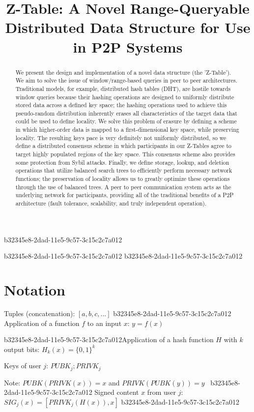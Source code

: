 \documentclass[12pt]{article}
\title{Z-Table: A Novel Range-Queryable Distributed Data Structure for Use in P2P Systems}
\begin{document}
\maketitle

b32345e8-2dad-11e5-9c57-3c15c2c7a012\begin{abstract}
We present the design and implementation of a novel data structure (the 'Z-Table'). We aim to solve the issue of window/range-based queries in peer to peer architectures. Traditional models, for example,  distributed hash tables (DHT), are hostile towards window queries because their hashing operations are designed to uniformly distribute stored data across a defined key space; the hashing operations used to achieve this pseudo-random distribution inherently erases all characteristics of the target data that could be used to define locality. We solve this problem of erasure by defining a scheme in which higher-order data is mapped to a first-dimensional key space, while preserving locality. The resulting keys pace is very definitely not uniformly distributed, so we define a distributed consensus scheme in which participants in our Z-Tables agree to target highly populated regions of the key space. This consensus scheme also provides some protection from Sybil attacks. Finally, we define storage, lookup, and deletion operations that utilize balanced search trees to efficiently perform necessary network functions; the preservation of locality allows us to greatly optimize these operations through the use of balanced trees. A peer to peer communication system acts as the underlying network for participants, providing all of the traditional benefits of a P2P architecture (fault tolerance, scalability, and truly independent operation).
\end{abstract}
b32345e8-2dad-11e5-9c57-3c15c2c7a012
b32345e8-2dad-11e5-9c57-3c15c2c7a012\section{Notation}

Tuples (concatenation): $[a,b,c,...]$
b32345e8-2dad-11e5-9c57-3c15c2c7a012
Application of a function $f$ to an input $x$: $y=f(x)$

b32345e8-2dad-11e5-9c57-3c15c2c7a012Application of a hash function $H$ with $k$ output bits: $H_{k}(x) = \{0,1\}^k$

Keys of user $j$: $ PUBK_j; PRIVK_j $

Note: $PUBK(PRIVK(x)) = x$ and $PRIVK(PUBK(y)) = y$~
b32345e8-2dad-11e5-9c57-3c15c2c7a012
Signed content $x$ from user $j$: $SIG_j(x) = \left[ PRIVK_j( H(x) ), x \right]$
b32345e8-2dad-11e5-9c57-3c15c2c7a012
\end{document}
